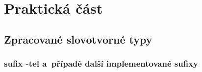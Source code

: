 \part{Praktická část}

\hypertarget{zpracovanuxe9-slovotvornuxe9-typy}{%
\chapter{Zpracované slovotvorné
typy}\label{zpracovanuxe9-slovotvornuxe9-typy}}

\hypertarget{sufix--tel-a-pux159uxedpadux11b-dalux161uxed-implementovanuxe9-sufixy}{%
\section{sufix -tel a~případě další implementované
sufixy}\label{sufix--tel-a-pux159uxedpadux11b-dalux161uxed-implementovanuxe9-sufixy}}

